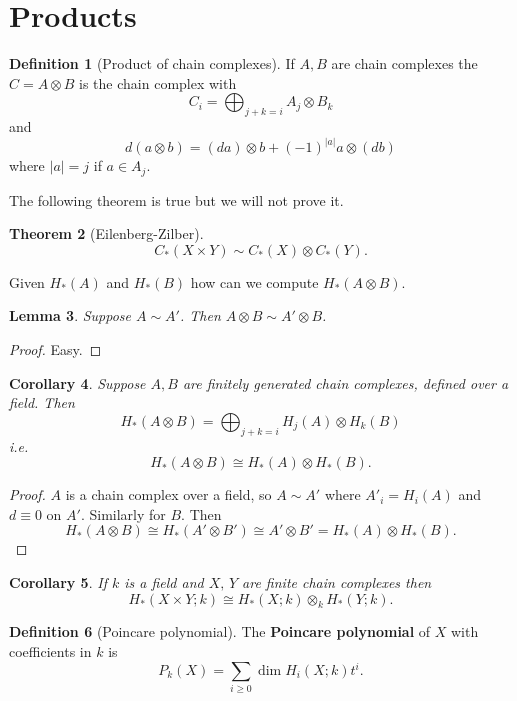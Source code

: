 \documentclass[10pt,]{book}
\newcommand{\terminology}[1]{\textbf{#1}}
\theoremstyle{plain}
\newtheorem{theorem}{Theorem}[section]
\newtheorem{corollary}[theorem]{Corollary}
\newtheorem{lemma}[theorem]{Lemma}
\theoremstyle{definition}
\newtheorem{definition}[theorem]{Definition}
\numberwithin{equation}{section}
\begin{document}
\section[Products]{Products}\label{sec-products}
\begin{definition}[Product of chain complexes]\label{definition-24}
If \(A,B\) are chain complexes the \(C=A \otimes B\) is the chain complex with
            \[C_i = \bigoplus_{j+k = i}A_j \otimes B_k\]
            and
            \[d(a\otimes b) = (da)\otimes b + (-1)^{|a|} a\otimes (db)\]
            where \(|a| = j\) if \(a \in A_j\).
          \end{definition}
The following theorem is true but we will not prove it.%
\begin{theorem}[Eilenberg-Zilber]\label{theorem-3}
\[C_*(X\times Y) \sim C_*(X) \otimes C_*(Y).\]\end{theorem}
\par
Given \(H_*(A)\) and \(H_*(B)\) how can we compute \(H_*(A\otimes B)\).%
\begin{lemma}\label{lemma-7}
Suppose \(A\sim A'\). Then \(A\otimes B \sim A'\otimes B\).\end{lemma}
\begin{proof}
Easy.\end{proof}
\begin{corollary}\label{corollary-6}
Suppose \(A,B\) are finitely generated chain complexes, defined over a field. Then
            \[H_*(A\otimes B) = \bigoplus_{j+k = i} H_j(A) \otimes H_k(B)\]
            i.e.
            \[H_*(A\otimes B) \cong H_*(A) \otimes H_*(B).\]\end{corollary}
\begin{proof}
\(A\) is a chain complex over a field, so \(A\sim A'\) where \(A'_i = H_i(A)\) and \(d \equiv 0\) on \(A'\).
            Similarly for \(B\).
            Then
            \[H_*(A\otimes B) \cong H_*(A'\otimes B') \cong A'\otimes B' = H_*(A)\otimes H_*(B).\]\end{proof}
\begin{corollary}\label{homology-product-is-tensor}
If \(k\) is a field and \(X,\,Y\) are finite chain complexes then
            \[H_*(X\times Y; k)\cong H_*(X; k) \otimes_k H_*(Y; k).\]\end{corollary}
\begin{definition}[Poincare polynomial]\label{definition-25}
The \terminology{Poincare polynomial} of \(X\) with coefficients in \(k\) is
            \[P_k(X) = \sum_{i\ge 0} \dim H_i(X; k) t^i.\]\end{definition}
\end{document}
